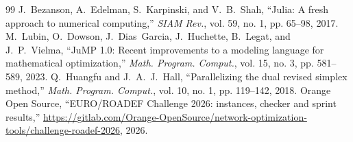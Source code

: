 \documentclass[conference]{IEEEtran}
\begin{document}
\begin{thebibliography}{99}
 J.~Bezanson, A.~Edelman, S.~Karpinski, and V.~B.~Shah, ``Julia: A fresh approach to numerical computing,'' \emph{SIAM Rev.}, vol. 59, no. 1, pp. 65--98, 2017.
 M.~Lubin, O.~Dowson, J.~Dias~Garcia, J.~Huchette, B.~Legat, and J.~P.~Vielma, ``JuMP 1.0: Recent improvements to a modeling language for mathematical optimization,'' \emph{Math. Program. Comput.}, vol. 15, no. 3, pp. 581--589, 2023.
 Q.~Huangfu and J.~A.~J.~Hall, ``Parallelizing the dual revised simplex method,'' \emph{Math. Program. Comput.}, vol. 10, no. 1, pp. 119--142, 2018.
 Orange Open Source, ``EURO/ROADEF Challenge 2026: instances, checker and sprint results,'' \url{https://gitlab.com/Orange-OpenSource/network-optimization-tools/challenge-roadef-2026}, 2026.
\end{thebibliography}
\end{document}
